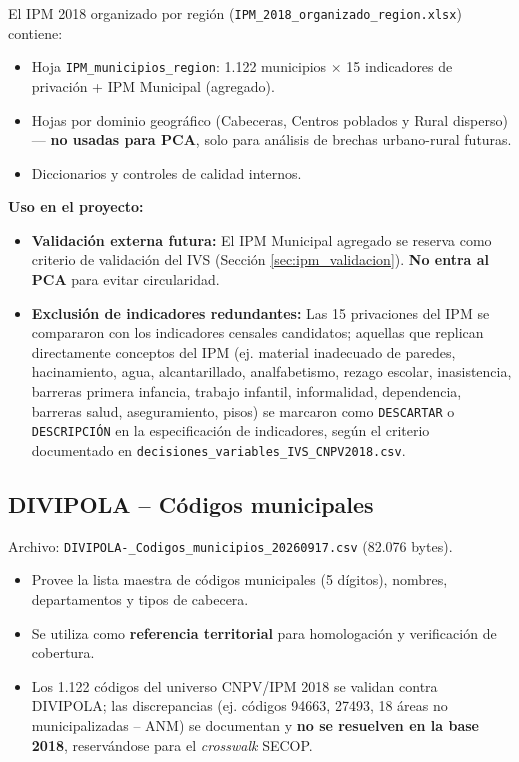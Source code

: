 El IPM 2018 organizado por región (\texttt{IPM\_2018\_organizado\_region.xlsx}) contiene:

\begin{itemize}
    \item Hoja \texttt{IPM\_municipios\_region}: 1.122 municipios $\times$ 15 indicadores de privación + IPM Municipal (agregado).
    \item Hojas por dominio geográfico (Cabeceras, Centros poblados y Rural disperso) --- \textbf{no usadas para PCA}, solo para análisis de brechas urbano-rural futuras.
    \item Diccionarios y controles de calidad internos.
\end{itemize}

\textbf{Uso en el proyecto:}
\begin{itemize}
    \item \textbf{Validación externa futura:} El IPM Municipal agregado se reserva como criterio de validación del IVS (Sección \ref{sec:ipm_validacion}). \textbf{No entra al PCA} para evitar circularidad.
    \item \textbf{Exclusión de indicadores redundantes:} Las 15 privaciones del IPM se compararon con los indicadores censales candidatos; aquellas que replican directamente conceptos del IPM (ej. material inadecuado de paredes, hacinamiento, agua, alcantarillado, analfabetismo, rezago escolar, inasistencia, barreras primera infancia, trabajo infantil, informalidad, dependencia, barreras salud, aseguramiento, pisos) se marcaron como \texttt{DESCARTAR} o \texttt{DESCRIPCIÓN} en la especificación de indicadores, según el criterio documentado en \texttt{decisiones\_variables\_IVS\_CNPV2018.csv}.
\end{itemize}

\subsection{DIVIPOLA -- Códigos municipales}
\label{sec:divipola}

Archivo: \texttt{DIVIPOLA-\_Codigos\_municipios\_20260917.csv} (82.076 bytes).

\begin{itemize}
    \item Provee la lista maestra de códigos municipales (5 dígitos), nombres, departamentos y tipos de cabecera.
    \item Se utiliza como \textbf{referencia territorial} para homologación y verificación de cobertura.
    \item Los 1.122 códigos del universo CNPV/IPM 2018 se validan contra DIVIPOLA; las discrepancias (ej. códigos 94663, 27493, 18 áreas no municipalizadas -- ANM) se documentan y \textbf{no se resuelven en la base 2018}, reservándose para el \textit{crosswalk} SECOP.
\end{itemize}

